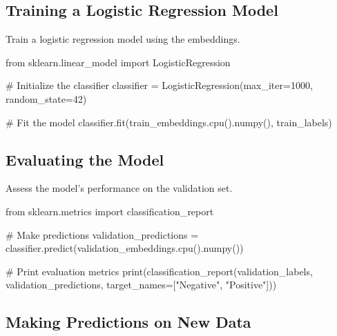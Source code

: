 \documentclass[
  letterpaper,
  DIV=11,
  numbers=noendperiod]{scrreprt}
\newenvironment{Shaded}{\begin{snugshade}}{\end{snugshade}}
\newcommand{\BuiltInTok}[1]{\textcolor[rgb]{0.00,0.23,0.31}{#1}}
\newcommand{\CommentTok}[1]{\textcolor[rgb]{0.37,0.37,0.37}{#1}}
\newcommand{\DecValTok}[1]{\textcolor[rgb]{0.68,0.00,0.00}{#1}}
\newcommand{\ImportTok}[1]{\textcolor[rgb]{0.00,0.46,0.62}{#1}}
\newcommand{\NormalTok}[1]{\textcolor[rgb]{0.00,0.23,0.31}{#1}}
\newcommand{\OperatorTok}[1]{\textcolor[rgb]{0.37,0.37,0.37}{#1}}
\newcommand{\StringTok}[1]{\textcolor[rgb]{0.13,0.47,0.30}{#1}}
\begin{document}
\subsection{Training a Logistic Regression
Model}\label{training-a-logistic-regression-model}

Train a logistic regression model using the embeddings.

\begin{Shaded}
\begin{Highlighting}[]
\ImportTok{from}\NormalTok{ sklearn.linear\_model }\ImportTok{import}\NormalTok{ LogisticRegression}

\CommentTok{\# Initialize the classifier}
\NormalTok{classifier }\OperatorTok{=}\NormalTok{ LogisticRegression(max\_iter}\OperatorTok{=}\DecValTok{1000}\NormalTok{, random\_state}\OperatorTok{=}\DecValTok{42}\NormalTok{)}

\CommentTok{\# Fit the model}
\NormalTok{classifier.fit(train\_embeddings.cpu().numpy(), train\_labels)}
\end{Highlighting}
\end{Shaded}

\subsection{Evaluating the Model}\label{evaluating-the-model}

Assess the model's performance on the validation set.

\begin{Shaded}
\begin{Highlighting}[]
\ImportTok{from}\NormalTok{ sklearn.metrics }\ImportTok{import}\NormalTok{ classification\_report}

\CommentTok{\# Make predictions}
\NormalTok{validation\_predictions }\OperatorTok{=}\NormalTok{ classifier.predict(validation\_embeddings.cpu().numpy())}

\CommentTok{\# Print evaluation metrics}
\BuiltInTok{print}\NormalTok{(classification\_report(validation\_labels, validation\_predictions, target\_names}\OperatorTok{=}\NormalTok{[}\StringTok{"Negative"}\NormalTok{, }\StringTok{"Positive"}\NormalTok{]))}
\end{Highlighting}
\end{Shaded}

\subsection{Making Predictions on New
Data}\label{making-predictions-on-new-data}
\end{document}
